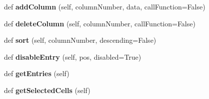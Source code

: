 \begin{DoxyCompactItemize}
def {\bfseries add\+Column} (self, column\+Number, data, call\+Function=False)
\item 
\mbox{\label{classappjar_1_1_simple_table_af7cb47c3a775fe3667109b0a5910fbb3}} 
def {\bfseries delete\+Column} (self, column\+Number, call\+Function=False)
\item 
\mbox{\label{classappjar_1_1_simple_table_a3d11dcaf9b3b5ca44061dae9157d6bf0}} 
def {\bfseries sort} (self, column\+Number, descending=False)
\item 
\mbox{\label{classappjar_1_1_simple_table_a710d9bd009d50998b221b7661cd29340}} 
def {\bfseries disable\+Entry} (self, pos, disabled=True)
\item 
\mbox{\label{classappjar_1_1_simple_table_a7872fd3a574b69e8cedbaf93d55b646c}} 
def {\bfseries get\+Entries} (self)
\item 
\mbox{\label{classappjar_1_1_simple_table_a071ec3e716d1b119f7be0da15f6891fe}} 
def {\bfseries get\+Selected\+Cells} (self)
\end{DoxyCompactItemize}
